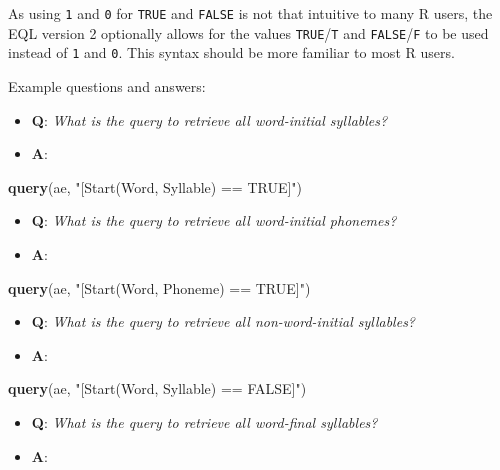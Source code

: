 \documentclass[]{book}
\newenvironment{Shaded}{\begin{snugshade}}{\end{snugshade}}
\newcommand{\KeywordTok}[1]{\textcolor[rgb]{0.13,0.29,0.53}{\textbf{#1}}}
\newcommand{\NormalTok}[1]{#1}
\newcommand{\StringTok}[1]{\textcolor[rgb]{0.31,0.60,0.02}{#1}}
\providecommand{\tightlist}{%
  \setlength{\itemsep}{0pt}\setlength{\parskip}{0pt}}
\theoremstyle{definition}
\theoremstyle{definition}
\theoremstyle{definition}
\theoremstyle{remark}
\begin{document}
As using \texttt{1} and \texttt{0} for \texttt{TRUE} and \texttt{FALSE}
is not that intuitive to many R users, the EQL version 2 optionally
allows for the values \texttt{TRUE}/\texttt{T} and
\texttt{FALSE}/\texttt{F} to be used instead of \texttt{1} and
\texttt{0}. This syntax should be more familiar to most R users.

Example questions and answers:

\begin{itemize}
\tightlist
\item
  \textbf{Q}: \emph{What is the query to retrieve all word-initial
  syllables?}
\item
  \textbf{A}:
\end{itemize}

\begin{Shaded}
\begin{Highlighting}[]
\KeywordTok{query}\NormalTok{(ae, }\StringTok{"[Start(Word, Syllable) == TRUE]"}\NormalTok{)}
\end{Highlighting}
\end{Shaded}

\begin{itemize}
\tightlist
\item
  \textbf{Q}: \emph{What is the query to retrieve all word-initial
  phonemes?}
\item
  \textbf{A}:
\end{itemize}

\begin{Shaded}
\begin{Highlighting}[]
\KeywordTok{query}\NormalTok{(ae, }\StringTok{"[Start(Word, Phoneme) == TRUE]"}\NormalTok{)}
\end{Highlighting}
\end{Shaded}

\begin{itemize}
\tightlist
\item
  \textbf{Q}: \emph{What is the query to retrieve all non-word-initial
  syllables?}
\item
  \textbf{A}:
\end{itemize}

\begin{Shaded}
\begin{Highlighting}[]
\KeywordTok{query}\NormalTok{(ae, }\StringTok{"[Start(Word, Syllable) == FALSE]"}\NormalTok{)}
\end{Highlighting}
\end{Shaded}

\begin{itemize}
\tightlist
\item
  \textbf{Q}: \emph{What is the query to retrieve all word-final
  syllables?}
\item
  \textbf{A}:
\end{itemize}
\end{document}

